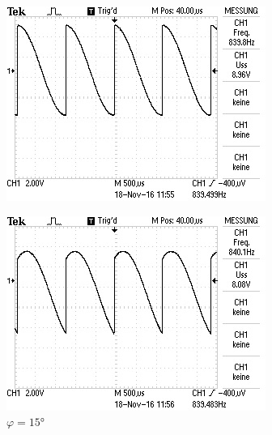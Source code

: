 \begin{figure}[!h]
\begin{minipage}[t]{0.3\textwidth}
\includegraphics[width=\textwidth]{Bilder/15.jpg}
\label{fig:1}
\caption{$\varphi = 15\si{\degree}$}
\end{minipage}
\hspace{10pt}
\vspace{5pt}
\begin{minipage}[t]{0.3\textwidth}
\includegraphics[width=\textwidth]{Bilder/45.jpg}

\end{minipage}
\end{figure}
